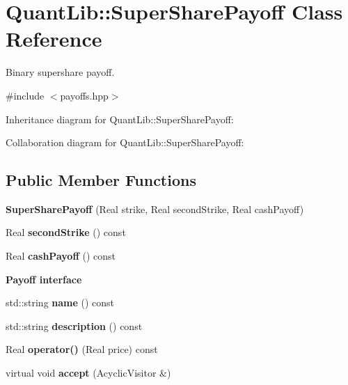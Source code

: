 \section{Quant\+Lib\+:\+:Super\+Share\+Payoff Class Reference}
\label{class_quant_lib_1_1_super_share_payoff}


Binary supershare payoff.  




{\ttfamily \#include $<$payoffs.\+hpp$>$}



Inheritance diagram for Quant\+Lib\+:\+:Super\+Share\+Payoff\+:


Collaboration diagram for Quant\+Lib\+:\+:Super\+Share\+Payoff\+:
\subsection*{Public Member Functions}
\begin{DoxyCompactItemize}
\item 
{\bfseries Super\+Share\+Payoff} (Real strike, Real second\+Strike, Real cash\+Payoff)\label{class_quant_lib_1_1_super_share_payoff_afcfeba6de950adaed55d23c42d948032}

\item 
Real {\bfseries second\+Strike} () const \label{class_quant_lib_1_1_super_share_payoff_ad7f947f0d970b966c983838aa75b9a4b}

\item 
Real {\bfseries cash\+Payoff} () const \label{class_quant_lib_1_1_super_share_payoff_a143af864a5443352d670a910f5971c07}

\end{DoxyCompactItemize}
\begin{Indent}{\bf Payoff interface}\par
\begin{DoxyCompactItemize}
\item 
std\+::string {\bfseries name} () const \label{class_quant_lib_1_1_super_share_payoff_a4547f75e916e2c014507744bb5cccf6f}

\item 
std\+::string {\bfseries description} () const \label{class_quant_lib_1_1_super_share_payoff_a6c9d8250625f25195f9ea42e031f5a16}

\item 
Real {\bfseries operator()} (Real price) const \label{class_quant_lib_1_1_super_share_payoff_a43cc996a62a0b36954e5ca15dec5de90}

\item 
virtual void {\bfseries accept} (Acyclic\+Visitor \&)\label{class_quant_lib_1_1_super_share_payoff_a153eb71a1f4cbe74f4c74f57d174c18d}

\end{DoxyCompactItemize}
\end{Indent}
